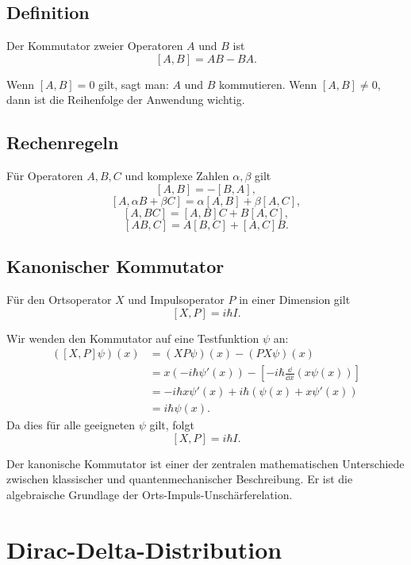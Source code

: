\subsection{Definition}

\begin{definitionbox}
Der Kommutator zweier Operatoren $A$ und $B$ ist
\[
    [A,B]=AB-BA.
\]
\end{definitionbox}

Wenn $[A,B]=0$ gilt, sagt man: $A$ und $B$ kommutieren. Wenn $[A,B]\ne0$, dann ist die Reihenfolge der Anwendung wichtig.

\subsection{Rechenregeln}

Für Operatoren $A,B,C$ und komplexe Zahlen $\alpha,\beta$ gilt
\[
    [A,B]=-[B,A],
\]
\[
    [A,\alpha B+\beta C]=\alpha[A,B]+\beta[A,C],
\]
\[
    [A,BC]=[A,B]C+B[A,C],
\]
\[
    [AB,C]=A[B,C]+[A,C]B.
\]

\subsection{Kanonischer Kommutator}

Für den Ortsoperator $X$ und Impulsoperator $P$ in einer Dimension gilt
\[
    [X,P]=i\hbar I.
\]

\begin{calculationbox}
Wir wenden den Kommutator auf eine Testfunktion $\psi$ an:
\[
\begin{aligned}
([X,P]\psi)(x)
&=(XP\psi)(x)-(PX\psi)(x)\\
&=x\left(-i\hbar\psi'(x)\right)
-\left[-i\hbar\frac{\dd}{\dd x}(x\psi(x))\right]\\
&=-i\hbar x\psi'(x)+i\hbar\left(\psi(x)+x\psi'(x)\right)\\
&=i\hbar\psi(x).
\end{aligned}
\]
Da dies für alle geeigneten $\psi$ gilt, folgt
\[
    [X,P]=i\hbar I.
\]
\end{calculationbox}

\begin{conceptbox}
Der kanonische Kommutator ist einer der zentralen mathematischen Unterschiede zwischen klassischer und quantenmechanischer Beschreibung. Er ist die algebraische Grundlage der Orts-Impuls-Unschärferelation.
\end{conceptbox}

\section{Dirac-Delta-Distribution}

